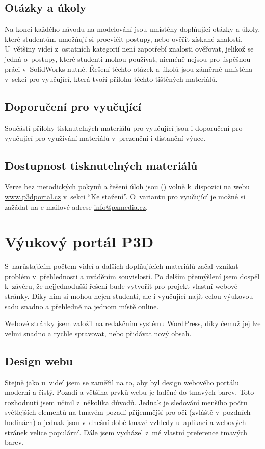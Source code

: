 \subsection{Otázky a úkoly}
Na konci každého návodu na modelování jsou umístěny doplňující otázky a úkoly, které studentům umožňují si procvičit postupy, nebo ověřit získané znalosti.
U~většiny videí z~ostatních kategorií není zapotřebí znalosti ověřovat, jelikož se jedná o~postupy, které studenti mohou používat, nicméně nejsou pro úspěšnou práci v~SolidWorks nutné.
Řešení těchto otázek a úkolů jsou záměrně umístěna v~sekci pro vyučující, která tvoří přílohu těchto tištěných materiálů.

\subsection*{Doporučení pro vyučující}
Součástí přílohy tisknutelných materiálů pro vyučující jsou i doporučení pro vyučující pro využívání materiálů v~prezenční i distanční výuce.

\subsection{Dostupnost tisknutelných materiálů}
Verze bez metodických pokynů a řešení úloh jsou (\fxnote[inline=true]{\textcolor{red}{BUDOU}}) volně k~dispozici na webu \href{https://www.p3dportal.cz}{www.p3dportal.cz} v~sekci \enquote{Ke stažení}.
O~variantu pro vyučující je možné si zažádat na e-mailové adrese \href{mailto:info@pxmedia.cz}{info@pxmedia.cz}.

\section{Výukový portál P3D}
S~narůstajícím počtem videí a dalších doplňujících materiálů začal vznikat problém v~přehlednosti a uváděním souvislostí.
Po delším přemýšlení jsem dospěl k~závěru, že nejjednodušší řešení bude vytvořit pro projekt vlastní webové stránky.
Díky nim si mohou nejen studenti, ale i vyučující najít celou výukovou sadu snadno a přehledně na jednom místě online.

Webové stránky jsem založil na redakčním systému WordPress, díky čemuž jej lze velmi snadno a rychle spravovat, nebo přidávat nový obsah.

\subsection{Design webu}
Stejně jako u~videí jsem se zaměřil na to, aby byl design webového portálu moderní a čistý.
Pozadí a většina prvků webu je laděné do tmavých barev.
Toto rozhodnutí jsem učinil z~několika důvodů.
Jednak je sledování menšího počtu světlejších elementů na tmavém pozadí příjemnější pro oči (zvláště v~pozdních hodinách) a jednak jsou v~dnešní době tmavé vzhledy u~aplikací a webových stránek velice populární.
Dále jsem vycházel z~mé vlastní preference tmavých barev.

